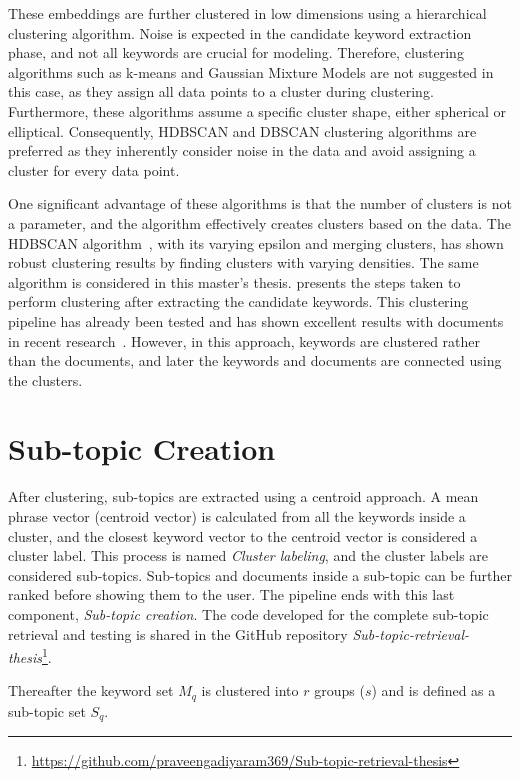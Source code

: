  
These embeddings are further clustered in low dimensions using a hierarchical clustering algorithm. Noise is expected in the candidate keyword extraction phase, and not all keywords are crucial for modeling. Therefore, clustering algorithms such as k-means and Gaussian Mixture Models are not suggested in this case, as they assign all data points to a cluster during clustering. Furthermore, these algorithms assume a specific cluster shape, either spherical or elliptical. Consequently, HDBSCAN and DBSCAN clustering algorithms are preferred as they inherently consider noise in the data and avoid assigning a cluster for every data point.

One significant advantage of these algorithms is that the number of clusters is not a parameter, and the algorithm effectively creates clusters based on the data. The HDBSCAN algorithm~\cite{mcinnes2017hdbscan}, with its varying epsilon and merging clusters, has shown robust clustering results by finding clusters with varying densities. The same algorithm is considered in this master's thesis.  presents the steps taken to perform clustering after extracting the candidate keywords. This clustering pipeline has already been tested and has shown excellent results with documents in recent research~\cite{angelov2020top2vec}. However, in this approach, keywords are clustered rather than the documents, and later the keywords and documents are connected using the clusters.




\section{Sub-topic Creation} 

After clustering, sub-topics are extracted using a centroid approach. A mean phrase vector (centroid vector) is calculated from all the keywords inside a cluster, and the closest keyword vector to the centroid vector is considered a cluster label. This process is named \textit{Cluster labeling}, and the cluster labels are considered sub-topics. Sub-topics and documents inside a sub-topic can be further ranked before showing them to the user. The pipeline ends with this last component, \textit{Sub-topic creation}. The code developed for the complete sub-topic retrieval and testing is shared in the GitHub repository \textit{Sub-topic-retrieval-thesis}\footnote{\url{https://github.com/praveengadiyaram369/Sub-topic-retrieval-thesis}}.


Thereafter the keyword set $M_q$ is clustered into $r$ groups ($s$) and is defined as a sub-topic set $S_q$. 

